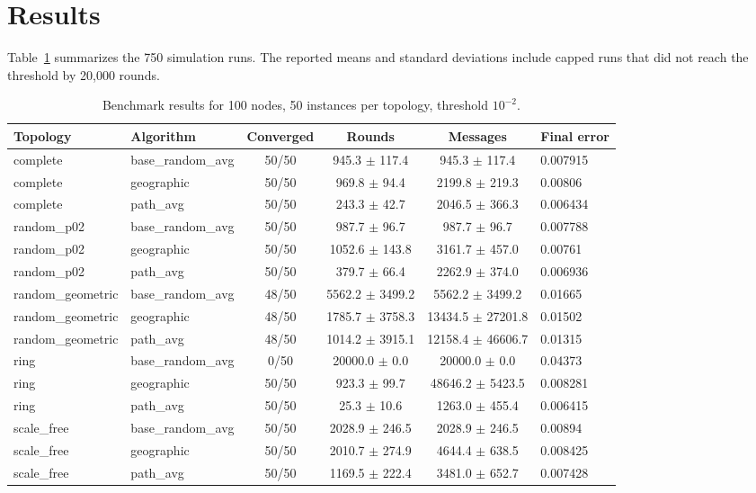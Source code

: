 \documentclass[conference]{IEEEtran}
\begin{document}
\section{Results}
Table~\ref{tab:results} summarizes the 750 simulation runs. The reported means and standard deviations include capped runs that did not reach the threshold by 20,000 rounds.

\begin{table}[t]
\centering
\caption{Benchmark results for 100 nodes, 50 instances per topology, threshold $10^{-2}$.}
\label{tab:results}
\begin{tabular}{llcccl}
\hline
Topology & Algorithm & Converged & Rounds & Messages & Final error \\
\hline
complete & base\_random\_avg & 50/50 & 945.3 $\pm$ 117.4 & 945.3 $\pm$ 117.4 & 0.007915 \\
complete & geographic & 50/50 & 969.8 $\pm$ 94.4 & 2199.8 $\pm$ 219.3 & 0.00806 \\
complete & path\_avg & 50/50 & 243.3 $\pm$ 42.7 & 2046.5 $\pm$ 366.3 & 0.006434 \\
random\_p02 & base\_random\_avg & 50/50 & 987.7 $\pm$ 96.7 & 987.7 $\pm$ 96.7 & 0.007788 \\
random\_p02 & geographic & 50/50 & 1052.6 $\pm$ 143.8 & 3161.7 $\pm$ 457.0 & 0.00761 \\
random\_p02 & path\_avg & 50/50 & 379.7 $\pm$ 66.4 & 2262.9 $\pm$ 374.0 & 0.006936 \\
random\_geometric & base\_random\_avg & 48/50 & 5562.2 $\pm$ 3499.2 & 5562.2 $\pm$ 3499.2 & 0.01665 \\
random\_geometric & geographic & 48/50 & 1785.7 $\pm$ 3758.3 & 13434.5 $\pm$ 27201.8 & 0.01502 \\
random\_geometric & path\_avg & 48/50 & 1014.2 $\pm$ 3915.1 & 12158.4 $\pm$ 46606.7 & 0.01315 \\
ring & base\_random\_avg & 0/50 & 20000.0 $\pm$ 0.0 & 20000.0 $\pm$ 0.0 & 0.04373 \\
ring & geographic & 50/50 & 923.3 $\pm$ 99.7 & 48646.2 $\pm$ 5423.5 & 0.008281 \\
ring & path\_avg & 50/50 & 25.3 $\pm$ 10.6 & 1263.0 $\pm$ 455.4 & 0.006415 \\
scale\_free & base\_random\_avg & 50/50 & 2028.9 $\pm$ 246.5 & 2028.9 $\pm$ 246.5 & 0.00894 \\
scale\_free & geographic & 50/50 & 2010.7 $\pm$ 274.9 & 4644.4 $\pm$ 638.5 & 0.008425 \\
scale\_free & path\_avg & 50/50 & 1169.5 $\pm$ 222.4 & 3481.0 $\pm$ 652.7 & 0.007428 \\
\hline
\end{tabular}
\end{table}
\end{document}
